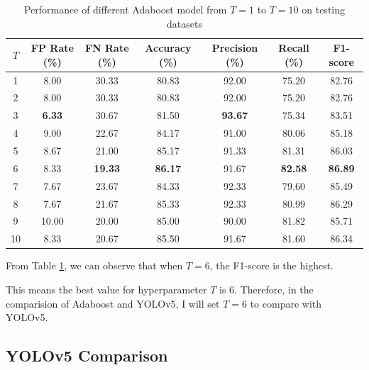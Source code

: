 \documentclass{article}[12pt]
\begin{document}
\begin{table}[H]
    \centering
    \caption{Performance of different Adaboost model from $T=1$ to $T=10$ on testing datasets}
    \begin{tabular}{@{}ccccccc@{}}
        \toprule
        $T$  & FP Rate (\%)  & FN Rate (\%)   & Accuracy (\%)  & Precision (\%)   & Recall (\%)      & F1-score  \\ \midrule
        1  & 8.00          & 30.33          & 80.83          & 92.00         & 75.20         & 82.76         \\
        2  & 8.00          & 30.33          & 80.83          & 92.00         & 75.20         & 82.76         \\
        3  & \textbf{6.33}          & 30.67          & 81.50          & \textbf{93.67} & 75.34         & 83.51         \\
        4  & 9.00          & 22.67          & 84.17          & 91.00         & 80.06         & 85.18         \\
        5  & 8.67          & 21.00          & 85.17          & 91.33         & 81.31         & 86.03         \\
        6  & 8.33 & \textbf{19.33} & \textbf{86.17} & 91.67         & \textbf{82.58} & \textbf{86.89} \\
        7  & 7.67          & 23.67          & 84.33          & 92.33         & 79.60         & 85.49         \\
        8  & 7.67          & 21.67          & 85.33          & 92.33         & 80.99         & 86.29         \\
        9  & 10.00         & 20.00          & 85.00          & 90.00         & 81.82         & 85.71         \\
        10 & 8.33          & 20.67          & 85.50          & 91.67         & 81.60         & 86.34         \\ \bottomrule
    \end{tabular}
    \label{tab:ada_test}    
\end{table}

From Table \ref{tab:ada_test}, we can observe that when $T=6$, the F1-score is the highest.

This means the best value for hyperparameter $T$ is 6. Therefore, in the comparision of Adaboost
and YOLOv5, I will set $T=6$ to compare with YOLOv5.
\subsection{YOLOv5 Comparison} \label{subsec:yolo_comp}
\end{document}
